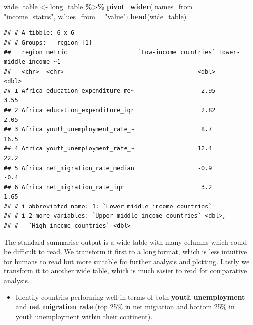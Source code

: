 \documentclass[
]{article}
\newenvironment{Shaded}{\begin{snugshade}}{\end{snugshade}}
\newcommand{\AttributeTok}[1]{\textcolor[rgb]{0.13,0.29,0.53}{#1}}
\newcommand{\FunctionTok}[1]{\textcolor[rgb]{0.13,0.29,0.53}{\textbf{#1}}}
\newcommand{\NormalTok}[1]{#1}
\newcommand{\OtherTok}[1]{\textcolor[rgb]{0.56,0.35,0.01}{#1}}
\newcommand{\SpecialCharTok}[1]{\textcolor[rgb]{0.81,0.36,0.00}{\textbf{#1}}}
\newcommand{\StringTok}[1]{\textcolor[rgb]{0.31,0.60,0.02}{#1}}
\providecommand{\tightlist}{%
  \setlength{\itemsep}{0pt}\setlength{\parskip}{0pt}}
\begin{document}
\begin{Shaded}
\begin{Highlighting}[]
\NormalTok{wide\_table }\OtherTok{\textless{}{-}}\NormalTok{ long\_table }\SpecialCharTok{\%\textgreater{}\%}
  \FunctionTok{pivot\_wider}\NormalTok{( }\AttributeTok{names\_from =} \StringTok{"income\_status"}\NormalTok{, }\AttributeTok{values\_from =} \StringTok{"value"}\NormalTok{)}
\FunctionTok{head}\NormalTok{(wide\_table)}
\end{Highlighting}
\end{Shaded}

\begin{verbatim}
## # A tibble: 6 x 6
## # Groups:   region [1]
##   region metric                    `Low-income countries` Lower-middle-income ~1
##   <chr>  <chr>                                      <dbl>                  <dbl>
## 1 Africa education_expenditure_me~                   2.95                   3.55
## 2 Africa education_expenditure_iqr                   2.82                   2.05
## 3 Africa youth_unemployment_rate_~                   8.7                   16.5 
## 4 Africa youth_unemployment_rate_~                  12.4                   22.2 
## 5 Africa net_migration_rate_median                  -0.9                   -0.4 
## 6 Africa net_migration_rate_iqr                      3.2                    1.65
## # i abbreviated name: 1: `Lower-middle-income countries`
## # i 2 more variables: `Upper-middle-income countries` <dbl>,
## #   `High-income countries` <dbl>
\end{verbatim}

The standard summarise output is a wide table with many columns which
could be difficult to read. We transform it first to a long format,
which is less intuitive for humans to read but more suitable for further
analysis and plotting. Lastly we transform it to another wide table,
which is much easier to read for comparative analysis.

\begin{itemize}
\tightlist
\item
  Identify countries performing well in terms of both \textbf{youth
  unemployment} and \textbf{net migration rate} (top 25\% in net
  migration and bottom 25\% in youth unemployment within their
  continent).
\end{itemize}
\end{document}

